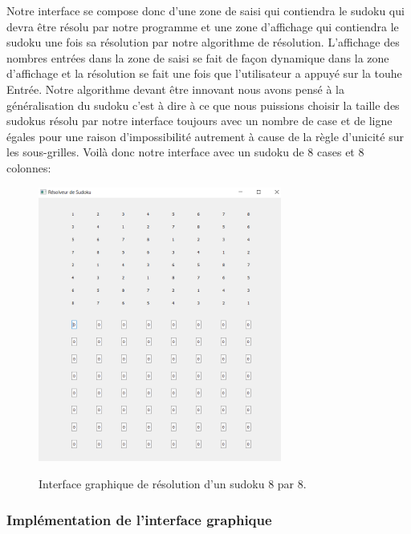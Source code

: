 Notre interface se compose donc d'une zone de saisi qui contiendra le sudoku qui devra être résolu par notre programme et une zone d'affichage qui contiendra le sudoku une fois sa résolution par notre algorithme de résolution. L'affichage des nombres entrées dans la zone de saisi se fait de façon dynamique dans la zone d'affichage et la résolution se fait une fois que l'utilisateur a appuyé sur la touhe Entrée. Notre algorithme devant être innovant nous avons pensé à la généralisation du sudoku c'est à dire à ce que nous puissions choisir la taille des sudokus résolu par notre interface toujours avec un nombre de case et de ligne égales pour une raison d'impossibilité autrement à cause de la règle d'unicité sur les sous-grilles.\newline
Voilà donc notre interface avec un sudoku de 8 cases et 8 colonnes:\newline

\begin{figure}[h]
  \begin{center}
\includegraphics[width=8cm]{./images/8_8.png}\label{Interface_affichage_8_8}
\caption{Interface graphique de résolution d'un sudoku 8 par 8.}
\end{center}
\end{figure}


\subsubsection{Implémentation de l'interface graphique}

